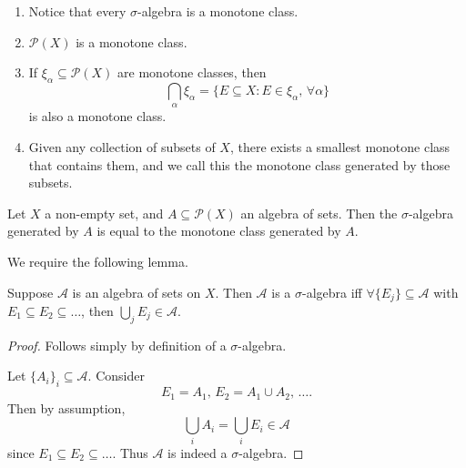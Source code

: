 \documentclass[notoc,notitlepage]{tufte-book}
\begin{document}
\begin{note}
  \begin{enumerate}
    \item Notice that every $\sigma$-algebra is a monotone class.
    \item $\mathcal{P}(X)$ is a monotone class.
    \item If $\xi_\alpha \subseteq \mathcal{P}(X)$ are monotone classes,
      then
      \begin{equation*}
        \bigcap_{\alpha} \xi_\alpha = \{ 
          E \subseteq X : E \in \xi_\alpha,\, \forall \alpha
        \}
      \end{equation*}
      is also a monotone class.
    \item Given any collection of subsets of $X$,
      there exists a smallest monotone class that contains them,
      and we call this the monotone class generated by those subsets.
  \end{enumerate}
\end{note}

\begin{thm}\label{thm:monotone_class_theorem}
  Let $X$ a non-empty set,
  and $A \subseteq \mathcal{P}(X)$ an algebra of sets.
  Then the $\sigma$-algebra generated by $A$ is equal
  to the monotone class generated by $A$.
\end{thm}

We require the following lemma.

\begin{lemma}\label{lemma:lemma_for_monotone_class_theorem}
  Suppose $\mathcal{A}$ is an algebra of sets on $X$.
  Then $\mathcal{A}$ is a $\sigma$-algebra iff
  $\forall \{ E_j \} \subseteq \mathcal{A}$
  with $E_1 \subseteq E_2 \subseteq \hdots$,
  then $\bigcup_{j} E_j \in \mathcal{A}$.
\end{lemma}

\begin{proof}
  \hlbnoted{$(\implies)$} Follows simply by definition of a $\sigma$-algebra.

  \noindent
  \hlbnoted{$(\impliedby)$} Let $\{ A_i \}_i \subseteq \mathcal{A}$.
  Consider
  \begin{equation*}
    E_1 = A_1,\, E_2 = A_1 \cup A_2,\, \hdots.
  \end{equation*}
  Then by assumption,
  \begin{equation*}
    \bigcup_{i} A_i = \bigcup_{i} E_i \in \mathcal{A}
  \end{equation*}
  since $E_1 \subseteq E_2 \subseteq \hdots$.
  Thus $\mathcal{A}$ is indeed a $\sigma$-algebra.
\end{proof}
\end{document}
